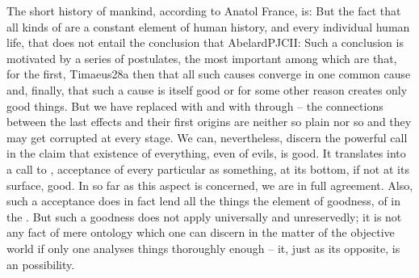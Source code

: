 \pa
 The short history
of mankind, according to Anatol France, is:  But the fact that all kinds of  are a constant element
of human history, and every individual human life, that  does not entail the
conclusion that \citet{it is good for any evil to exist, although nevertheless
  no evil is good.}{AbelardPJC}{II:} Such a conclusion is motivated by a 
series of postulates, the most important among which are that, for the first,
\citet{everything that becomes or is created 
  must of necessity be created by some cause, for without a cause nothing can be
  created,}{Timaeus}{28a} then that all such causes converge in one common cause
and, finally, that such a cause is itself good or for some other reason creates
only good things. 
But we have replaced  with  and  with
 through  -- the connections between the last
effects and their first origins are neither so plain nor so  and
they may get corrupted at every stage. We can,
nevertheless, discern the powerful  call in the claim that 
 existence of everything, even of evils, is good. It translates into a call to
 ,  acceptance of every particular as
 something, at its bottom, if not at its surface, good. In so far as this aspect
 is concerned, we are in full agreement. Also, such a 
 acceptance does in fact lend all the things the element of goodness, of
  in the . But such a goodness does not apply
 universally and unreservedly; it is not any fact of mere ontology which one can
 discern in the matter of the objective world if only one analyses things
 thoroughly enough -- it, just as its opposite, is an  possibility.



